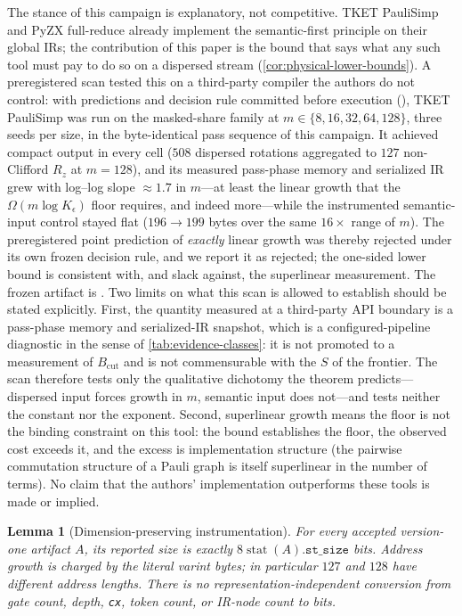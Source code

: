 \documentclass[a4paper,twocolumn,10pt,unpublished]{quantumarticle}
\newtheorem{lemma}{Lemma}
\begin{document}
The stance of this campaign is explanatory, not competitive.  TKET
PauliSimp and PyZX full-reduce already implement the semantic-first
principle on their global IRs; the contribution of this paper is the
bound that says what any such tool must pay to do so on a dispersed
stream (\cref{cor:physical-lower-bounds}).  A preregistered scan tested
this on a third-party compiler the authors do not control: with
predictions and decision rule committed before execution
(), TKET PauliSimp was
run on the masked-share family at $m\in\{8,16,32,64,128\}$, three seeds
per size, in the byte-identical pass sequence of this campaign.  It
achieved compact output in every cell ($508$ dispersed rotations
aggregated to $127$ non-Clifford $R_z$ at $m=128$), and its measured
pass-phase memory and serialized IR grew with log--log slope
$\approx1.7$ in $m$---at least the linear growth that the
$\Omega(m\log K_\epsilon)$ floor requires, and indeed more---while the
instrumented semantic-input control stayed flat ($196\to199$ bytes over
the same $16\times$ range of $m$).  The preregistered point prediction
of \emph{exactly} linear growth was thereby rejected under its own
frozen decision rule, and we report it as rejected; the one-sided lower
bound is consistent with, and slack against, the superlinear
measurement.  The frozen artifact is
.  Two limits on what this
scan is allowed to establish should be stated explicitly.  First, the
quantity measured at a third-party API boundary is a pass-phase memory
and serialized-IR snapshot, which is a configured-pipeline diagnostic in
the sense of \cref{tab:evidence-classes}: it is not promoted to a
measurement of $B_{\mathrm{cut}}$ and is not commensurable with the $S$
of the frontier.  The scan therefore tests only the qualitative
dichotomy the theorem predicts---dispersed input forces growth in $m$,
semantic input does not---and tests neither the constant nor the
exponent.  Second, superlinear growth means the floor is not the binding
constraint on this tool: the bound establishes the floor, the observed
cost exceeds it, and the excess is implementation structure (the
pairwise commutation structure of a Pauli graph is itself
superlinear in the number of terms).  No claim that
the authors' implementation outperforms these tools is made or implied.

\begin{lemma}[Dimension-preserving instrumentation]
\label{lem:metric-conversion}
For every accepted version-one artifact $A$, its reported size is exactly
$8\operatorname{stat}(A).\mathtt{st\_size}$ bits.  Address growth is charged by
the literal varint bytes; in particular $127$ and $128$ have different address
lengths.  There is no representation-independent conversion from gate count,
depth, \texttt{cx}, token count, or IR-node count to bits.
\end{lemma}
\end{document}
